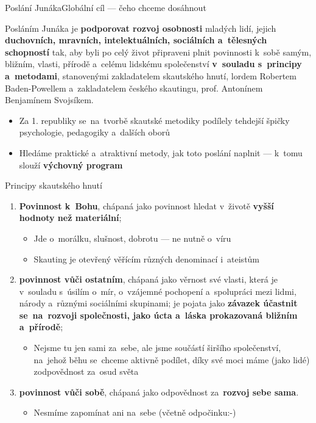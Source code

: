 \documentclass[compress, ucs, xelatex, 11pt, xcolor=dvipsnames, print, aspectratio=169,
	hyperref={
		bookmarks=true,
		unicode=true,
		colorlinks=true,
		pdftitle={Skautska vychovna metoda},
		plainpages=false,
		pdfauthor={Vojtech Zeisek},
		pdfsubject={Skautska vychovna metoda a jeji vyvoj za posledni stoleti a desetileti},
		pdfcreator={XeLaTeX},
		pdfkeywords={Junak, Pedagogika, Skaut, Skauting, Vychovna metoda},
		linkcolor=Red, %
		anchorcolor=ForestGreen, %
		citecolor=ForestGreen, %
		filecolor=ForestGreen, %
		menucolor=ForestGreen, %
		urlcolor=Sepia, %
		pdftex},
	url={hyphens, lowtilde} %
	]{beamer}
\begin{document}
\begin{frame}{Poslání Junáka}{Globální cíl --- čeho chceme dosáhnout}
	\begin{center}
		\begin{Large}
			Posláním Junáka je \textbf{podporovat rozvoj osobnosti} mladých lidí, jejich \textbf{duchovních, mravních, intelektuálních, sociálních a~tělesných schopností} tak, aby byli po celý život připraveni plnit povinnosti k~sobě samým, bližním, vlasti, přírodě a~celému lidskému společenství \textbf{v~souladu s~principy a~metodami}, stanovenými zakladatelem skautského hnutí, lordem Robertem Baden-Powellem a~zakladatelem českého skautingu, prof. Antonínem Benjamínem Svojsíkem.
		\end{Large}
	\end{center}
	\begin{itemize}
		\item Za 1. republiky se~na~tvorbě skautské metodiky podílely tehdejší špičky psychologie, pedagogiky a~dalších oborů
		\item Hledáme praktické a~atraktivní metody, jak toto poslání naplnit --- k~tomu slouží \textbf{výchovný program}
	\end{itemize}
\end{frame}

\begin{frame}{Principy skautského hnutí}
	\begin{enumerate}
		\item \textbf{Povinnost k~Bohu}, chápaná jako povinnost hledat v~životě \textbf{vyšší hodnoty než materiální};
		\begin{itemize}
			\item Jde o~morálku, slušnost, dobrotu --- ne nutně o~víru
			\item Skauting je otevřený věřícím různých denominací i~ateistům
		\end{itemize}
		\item \textbf{povinnost vůči ostatním}, chápaná jako věrnost své vlasti, která je v~souladu s~úsilím o~mír, o~vzájemné pochopení a~spolupráci mezi lidmi, národy a~různými sociálními skupinami; je pojata jako \textbf{závazek účastnit se~na~rozvoji společnosti, jako úcta a~láska prokazovaná bližním a~přírodě};
		\begin{itemize}
			\item Nejsme tu jen sami za~sebe, ale jsme součástí širšího společenství, na~jehož běhu se~chceme aktivně podílet, díky své moci máme (jako lidé) zodpovědnost za~osud světa
		\end{itemize}
		\item \textbf{povinnost vůči sobě}, chápaná jako odpovědnost za~\textbf{rozvoj sebe sama}.
		\begin{itemize}
			\item Nesmíme zapomínat ani na~sebe (včetně odpočinku:-)
		\end{itemize}
	\end{enumerate}
\end{frame}
\end{document}
